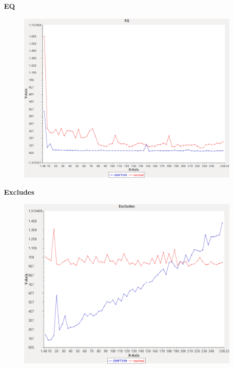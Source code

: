 \noindent\textbf{EQ}

\begin{figure}[h]
\centering
\includegraphics[width=\textwidth]{graphs/set/EQ}
\end{figure}
\pagebreak

\noindent\textbf{Excludes}

\begin{figure}[h]
\centering
\includegraphics[width=\textwidth]{graphs/set/Excludes}
\end{figure}
\pagebreak

